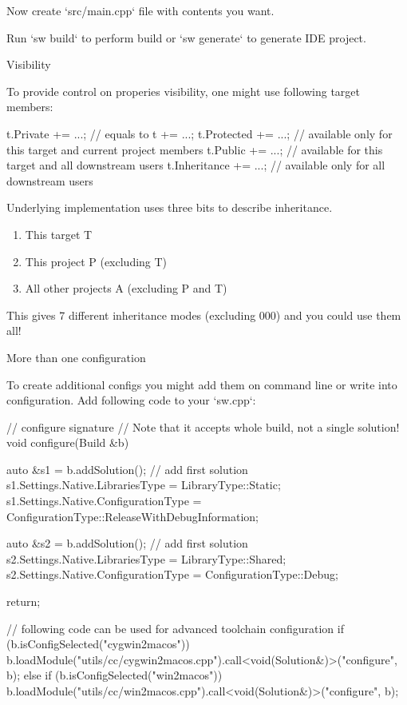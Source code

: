 Now create `src/main.cpp` file with contents you want.

Run `sw build` to perform build or `sw generate` to generate IDE project.



Visibility

To provide control on properies visibility, one might use following target members:

\begin{swcpp}
t.Private += ...; // equals to t += ...;
t.Protected += ...; // available only for this target and current project members
t.Public += ...; // available for this target and all downstream users
t.Inheritance += ...; // available only for all downstream users
\end{swcpp}

Underlying implementation uses three bits to describe inheritance.

\begin{enumerate}
\item This target T
\item This project P (excluding T)
\item All other projects A (excluding P and T)
\end{enumerate}

This gives 7 different inheritance modes (excluding 000) and you could use them all!





More than one configuration

To create additional configs you might add them on command line or write into configuration.
Add following code to your `sw.cpp`:

\begin{swcpp}
// configure signature
// Note that it accepts whole build, not a single solution!
void configure(Build &b)
{
    auto &s1 = b.addSolution(); // add first solution
    s1.Settings.Native.LibrariesType = LibraryType::Static;
    s1.Settings.Native.ConfigurationType = ConfigurationType::ReleaseWithDebugInformation;

    auto &s2 = b.addSolution(); // add first solution
    s2.Settings.Native.LibrariesType = LibraryType::Shared;
    s2.Settings.Native.ConfigurationType = ConfigurationType::Debug;

    return;

    // following code can be used for advanced toolchain configuration
    if (b.isConfigSelected("cygwin2macos"))
        b.loadModule("utils/cc/cygwin2macos.cpp").call<void(Solution&)>("configure", b);
    else if (b.isConfigSelected("win2macos"))
        b.loadModule("utils/cc/win2macos.cpp").call<void(Solution&)>("configure", b);
}
\end{swcpp}

